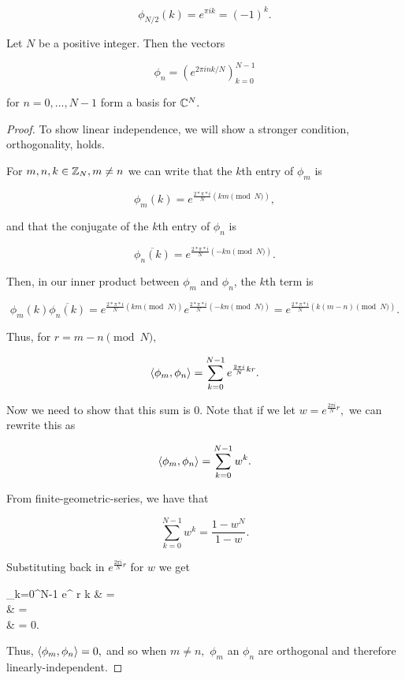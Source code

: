 \documentclass{article}
\begin{document}
\[ \phi_{N/2}(k) = e^{\pi i k} = (-1)^k. \]

\begin{theorem}\label{fourier-basis}
Let $N$ be a positive integer. Then the vectors

\[ \phi_n = (e^{2 \pi i n k  / N})_{k=0}^{N-1} \]

for $n = 0, \dots, N-1$ form a basis for $\mathbb{C}^N.$
\end{theorem}

\begin{proof}
To show linear independence, we will show a stronger condition, orthogonality, holds.

For $m,n,k \in \mathbb{Z}_N, m \neq n$ we can write that the $k$th entry of $\phi_m$ is

\[ \phi_m(k) = e^{\frac{2 * \pi * i}{N} ( km \pmod{N} )}, \]

and that the conjugate of the $k$th entry of $\phi_n$ is

\[ \overline{\phi_n(k)} = e^{\frac{2 * \pi * i}{N} ( -kn \pmod{N} )}. \]

Then, in our inner product between $\phi_m$ and $\phi_n$, the $k$th term is

\[ \phi_m(k) \overline{\phi_n(k)} = e^{\frac{2 * \pi * i}{N} ( km \pmod{N} )} e^{\frac{2 * \pi * i}{N} ( -kn \pmod{N} )} = e^{\frac{2 * \pi * i}{N} ( k(m-n) \pmod{N} )}. \]

Thus, for $r = m - n \pmod{N},$

\[ \left\langle \phi_m, \phi_n \right\rangle = \sum_{k=0}^{N-1} e^{\frac{2 \pi i}{N} kr}. \]

Now we need to show that this sum is $0.$ Note that if we let $w = e^{\frac{2 \pi i}{N} r},$ we can rewrite this as

\[ \left\langle \phi_m, \phi_n \right\rangle = \sum_{k=0}^{N-1} w^k. \]

From \@{finite-geometric-series}, we have that

\[ \sum_{k=0}^{N-1} w^k = \frac{1 - w^N}{1 - w}. \]

Substituting back in $e^{\frac{2 \pi i}{N} r}$ for $w$ we get

\bal
\sum_{k=0}^{N-1} e^{ r k} & =  \\
                                           & =  \\
                                           & = 0.
\eal

Thus, $\left\langle \phi_m, \phi_n \right\rangle = 0,$ and so when $m \neq n,$ $\phi_m$ an $\phi_n$ are \@{orthogonal} and therefore \@{linearly-independent}.


\end{proof}
\end{document}
